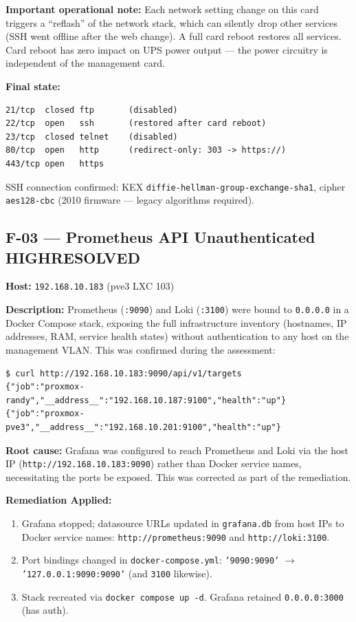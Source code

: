 \documentclass[11pt,a4paper]{article}
\newcommand{\high}{\colorbox{high}{\color{white}\small\textbf{HIGH}}}
\newcommand{\resolved}{\colorbox{resolved}{\color{white}\small\textbf{RESOLVED}}}
\begin{document}
\textbf{Important operational note:} Each network setting change on this card triggers a
``reflash'' of the network stack, which can silently drop other services (SSH went offline
after the web change). A full card reboot restores all services. Card reboot has zero impact
on UPS power output — the power circuitry is independent of the management card.

\textbf{Final state:}
\begin{lstlisting}
21/tcp  closed ftp       (disabled)
22/tcp  open   ssh       (restored after card reboot)
23/tcp  closed telnet    (disabled)
80/tcp  open   http      (redirect-only: 303 -> https://)
443/tcp open   https
\end{lstlisting}

SSH connection confirmed: KEX \texttt{diffie-hellman-group-exchange-sha1}, cipher
\texttt{aes128-cbc} (2010 firmware — legacy algorithms required).

\subsection{F-03 — Prometheus API Unauthenticated \quad \high \quad \resolved}

\textbf{Host:} \texttt{192.168.10.183} (pve3 LXC 103)

\textbf{Description:} Prometheus (\texttt{:9090}) and Loki (\texttt{:3100}) were bound to
\texttt{0.0.0.0} in a Docker Compose stack, exposing the full infrastructure inventory
(hostnames, IP addresses, RAM, service health states) without authentication to any host on
the management VLAN. This was confirmed during the assessment:

\begin{lstlisting}
$ curl http://192.168.10.183:9090/api/v1/targets
{"job":"proxmox-randy","__address__":"192.168.10.187:9100","health":"up"}
{"job":"proxmox-pve3","__address__":"192.168.10.201:9100","health":"up"}
\end{lstlisting}

\textbf{Root cause:} Grafana was configured to reach Prometheus and Loki via the host IP
(\texttt{http://192.168.10.183:9090}) rather than Docker service names, necessitating the
ports be exposed. This was corrected as part of the remediation.

\textbf{Remediation Applied:}
\begin{enumerate}[nosep]
  \item Grafana stopped; datasource URLs updated in \texttt{grafana.db} from host IPs to
    Docker service names: \texttt{http://prometheus:9090} and \texttt{http://loki:3100}.
  \item Port bindings changed in \texttt{docker-compose.yml}:
    \texttt{'9090:9090'} $\to$ \texttt{'127.0.0.1:9090:9090'} (and \texttt{3100} likewise).
  \item Stack recreated via \texttt{docker compose up -d}. Grafana retained \texttt{0.0.0.0:3000} (has auth).
\end{enumerate}
\end{document}
